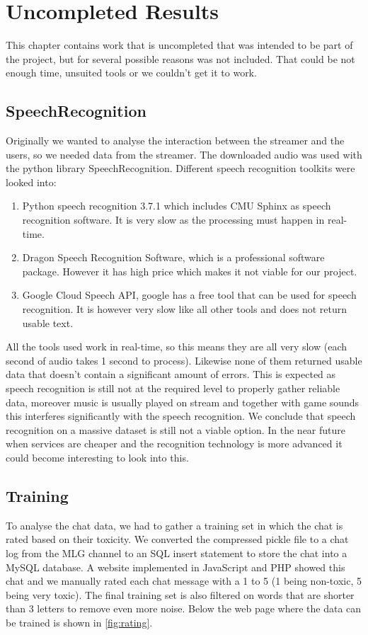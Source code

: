 \documentclass[final]{report}
\begin{document}
\chapter{Uncompleted Results}
\label{ch:Uncompleted Results}

This chapter contains work that is uncompleted that was intended to be part of the project, but for several possible reasons was not included. That could be not enough time, unsuited tools or we couldn't get it to work. 

\section{SpeechRecognition}
Originally we wanted to analyse the interaction between the streamer and the users, so we needed data from the streamer.
The downloaded audio was used with the python library SpeechRecognition. %
Different speech recognition toolkits were looked into:
\begin{enumerate}
\item Python speech recognition 3.7.1 which includes CMU Sphinx as speech recognition software. It is very slow as the processing must happen in real-time.
\item Dragon Speech Recognition Software, which is a professional software package. However it has high price which makes it not viable for our project.
\item Google Cloud Speech API, google has a free tool that can be used for speech recognition. It is however very slow like all other tools and does not return usable text.
\end{enumerate}

All the tools used work in real-time, so this means they are all very slow (each second of audio takes 1 second to process). Likewise none of them returned usable data that doesn't contain a significant amount of errors.
This is expected as speech recognition is still not at the required level to properly gather reliable data, moreover music is usually played on stream and together with game sounds this interferes significantly with the speech recognition.
We conclude that speech recognition on a massive dataset is still not a viable option.
In the near future when services are cheaper and the recognition technology is more advanced it could become interesting to look into this.

\section{Training}
To analyse the chat data, we had to gather a training set in which the chat is rated based on their toxicity.
We converted the compressed pickle file to a chat log from the MLG channel to an SQL insert statement to store the chat into a MySQL database.
A website implemented in JavaScript and PHP showed this chat and we manually rated each chat message with a 1 to 5 (1 being non-toxic, 5 being very toxic). The final training set is also filtered on words that are shorter than 3 letters to remove even more noise. Below the web page where the data can be trained is shown in \ref{fig:rating}.
\end{document}
